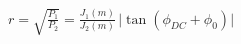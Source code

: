 \documentclass[border=1pt]{standalone}
\begin{document}
\fontsize{14}{16.8}\selectfont
\(\displaystyle r = \sqrt{\frac{P_1}{P_2}} = \frac{J_1(m)}{J_2(m)}\,\bigl|\tan(\phi_{DC}+\phi_0)\bigr|\)
\end{document}
